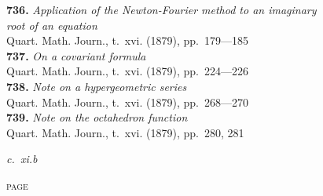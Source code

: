 \documentclass[12pt,a4paper,oneside]{book}
\begin{document}
\textbf{736.} \textit{Application of the Newton-Fourier method to an imaginary}\\
\hspace*{2em}\textit{root of an equation} \\
\hspace*{2em}Quart. Math. Journ., t.~xvi. (1879), pp.~179---185\\[0.4em]
\textbf{737.} \textit{On a covariant formula} \\
\hspace*{2em}Quart. Math. Journ., t.~xvi. (1879), pp.~224---226\\[0.4em]
\textbf{738.} \textit{Note on a hypergeometric series} \\
\hspace*{2em}Quart. Math. Journ., t.~xvi. (1879), pp.~268---270\\[0.4em]
\textbf{739.} \textit{Note on the octahedron function} \\
\hspace*{2em}Quart. Math. Journ., t.~xvi. (1879), pp.~280, 281

\begin{flushright}
\textit{c.~xi.}\hspace{4em}\textit{b}
\end{flushright}

\clearpage

\vspace*{0.5em}

\hfill\textsc{page}
\end{document}
